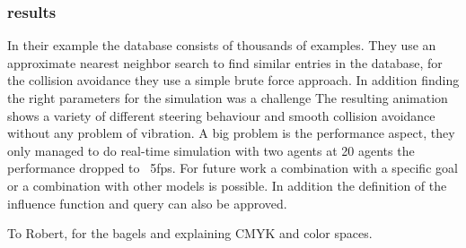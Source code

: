 \documentclass[sigconf]{acmart}
\begin{document}
\subsubsection{results}
In their example the database consists of thousands of examples. They use an approximate nearest neighbor search to find similar entries in the database, for the collision avoidance they use a simple brute force approach. In addition finding the right parameters for the simulation was a challenge
The resulting animation shows a variety of different steering behaviour and smooth collision avoidance without any problem of vibration.  
A big problem is the performance aspect, they only managed to do real-time simulation with two agents at 20 agents the performance dropped to ~5fps. 
For future work a combination with a specific goal or a combination with other models is possible. In addition the definition of the influence function and query can also be approved.


\begin{acks}
To Robert, for the bagels and explaining CMYK and color spaces.
\end{acks}




\appendix
\end{document}
